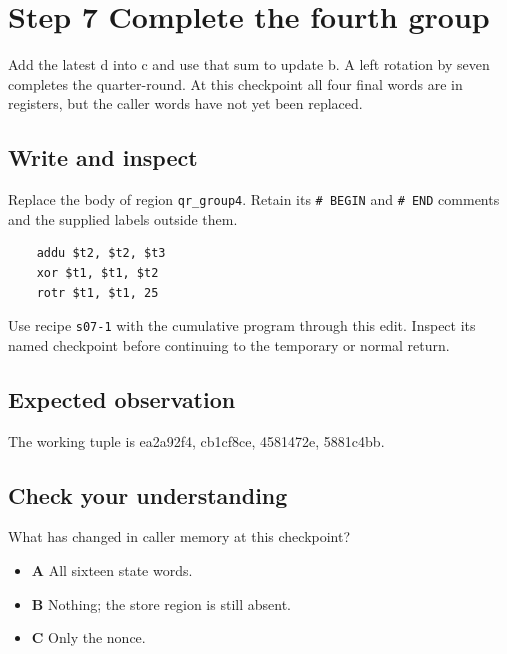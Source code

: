 \section{Step 7 Complete the fourth group}\label{chacha-s07}

Add the latest d into c and use that sum to update b. A left rotation by seven completes the quarter-round. At this checkpoint all four final words are in registers, but the caller words have not yet been replaced.

\subsection{Write and inspect}
Replace the body of region \texttt{qr\_group4}. Retain its \texttt{\# BEGIN} and \texttt{\# END} comments and the supplied labels outside them.

\begin{verbatim}
    addu $t2, $t2, $t3
    xor $t1, $t1, $t2
    rotr $t1, $t1, 25
\end{verbatim}

Use recipe \texttt{s07-1} with the cumulative program through this edit. Inspect its named checkpoint before continuing to the temporary or normal return.

\subsection{Expected observation}
The working tuple is ea2a92f4, cb1cf8ce, 4581472e, 5881c4bb.

\subsection{Check your understanding}
What has changed in caller memory at this checkpoint?

\begin{itemize}
\item \textbf{A} All sixteen state words.
\item \textbf{B} Nothing; the store region is still absent.
\item \textbf{C} Only the nonce.
\end{itemize}
